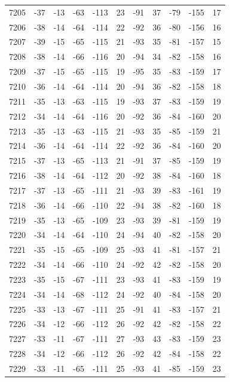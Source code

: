 \begin{table}[H]
\begin{tabular}{lllllllllll}
7205 & -37 & -13 & -63 & -113 & 23 & -91 & 37 & -79 & -155 & 17 \\
7206 & -38 & -14 & -64 & -114 & 22 & -92 & 36 & -80 & -156 & 16 \\
7207 & -39 & -15 & -65 & -115 & 21 & -93 & 35 & -81 & -157 & 15 \\
7208 & -38 & -14 & -66 & -116 & 20 & -94 & 34 & -82 & -158 & 16 \\
7209 & -37 & -15 & -65 & -115 & 19 & -95 & 35 & -83 & -159 & 17 \\
7210 & -36 & -14 & -64 & -114 & 20 & -94 & 36 & -82 & -158 & 18 \\
7211 & -35 & -13 & -63 & -115 & 19 & -93 & 37 & -83 & -159 & 19 \\
7212 & -34 & -14 & -64 & -116 & 20 & -92 & 36 & -84 & -160 & 20 \\
7213 & -35 & -13 & -63 & -115 & 21 & -93 & 35 & -85 & -159 & 21 \\
7214 & -36 & -14 & -64 & -114 & 22 & -92 & 36 & -84 & -160 & 20 \\
7215 & -37 & -13 & -65 & -113 & 21 & -91 & 37 & -85 & -159 & 19 \\
7216 & -38 & -14 & -64 & -112 & 20 & -92 & 38 & -84 & -160 & 18 \\
7217 & -37 & -13 & -65 & -111 & 21 & -93 & 39 & -83 & -161 & 19 \\
7218 & -36 & -14 & -66 & -110 & 22 & -94 & 38 & -82 & -160 & 18 \\
7219 & -35 & -13 & -65 & -109 & 23 & -93 & 39 & -81 & -159 & 19 \\
7220 & -34 & -14 & -64 & -110 & 24 & -94 & 40 & -82 & -158 & 20 \\
7221 & -35 & -15 & -65 & -109 & 25 & -93 & 41 & -81 & -157 & 21 \\
7222 & -34 & -14 & -66 & -110 & 24 & -92 & 42 & -82 & -158 & 20 \\
7223 & -35 & -15 & -67 & -111 & 23 & -93 & 41 & -83 & -159 & 19 \\
7224 & -34 & -14 & -68 & -112 & 24 & -92 & 40 & -84 & -158 & 20 \\
7225 & -33 & -13 & -67 & -111 & 25 & -91 & 41 & -83 & -157 & 21 \\
7226 & -34 & -12 & -66 & -112 & 26 & -92 & 42 & -82 & -158 & 22 \\
7227 & -33 & -11 & -67 & -111 & 27 & -93 & 43 & -83 & -159 & 23 \\
7228 & -34 & -12 & -66 & -112 & 26 & -92 & 42 & -84 & -158 & 22 \\
7229 & -33 & -11 & -65 & -111 & 25 & -93 & 41 & -85 & -159 & 23 \\

\end{tabular}
\end{table}
